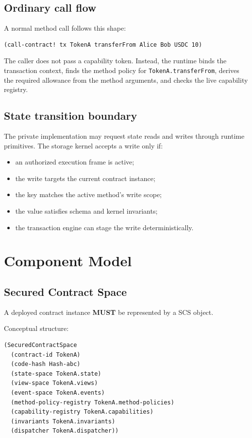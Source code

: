 \documentclass[11pt]{article}
\newcommand{\SCS}{\textsc{SCS}}
\newcommand{\MUST}{\textbf{MUST}}
\newcommand{\code}[1]{\texttt{#1}}
\begin{document}
\subsection{Ordinary call flow}

A normal method call follows this shape:

\begin{lstlisting}
(call-contract! tx TokenA transferFrom Alice Bob USDC 10)
\end{lstlisting}

The caller does not pass a capability token. Instead, the runtime binds the transaction context, finds the method policy for \code{TokenA.transferFrom}, derives the required allowance from the method arguments, and checks the live capability registry.

\subsection{State transition boundary}

The private implementation may request state reads and writes through runtime primitives. The storage kernel accepts a write only if:

\begin{itemize}
  \item an authorized execution frame is active;
  \item the write targets the current contract instance;
  \item the key matches the active method's write scope;
  \item the value satisfies schema and kernel invariants;
  \item the transaction engine can stage the write deterministically.
\end{itemize}



\section{Component Model}

\subsection{Secured Contract Space}

A deployed contract instance \MUST{} be represented by a \SCS{} object.

Conceptual structure:

\begin{lstlisting}
(SecuredContractSpace
  (contract-id TokenA)
  (code-hash Hash-abc)
  (state-space TokenA.state)
  (view-space TokenA.views)
  (event-space TokenA.events)
  (method-policy-registry TokenA.method-policies)
  (capability-registry TokenA.capabilities)
  (invariants TokenA.invariants)
  (dispatcher TokenA.dispatcher))
\end{lstlisting}
\end{document}
